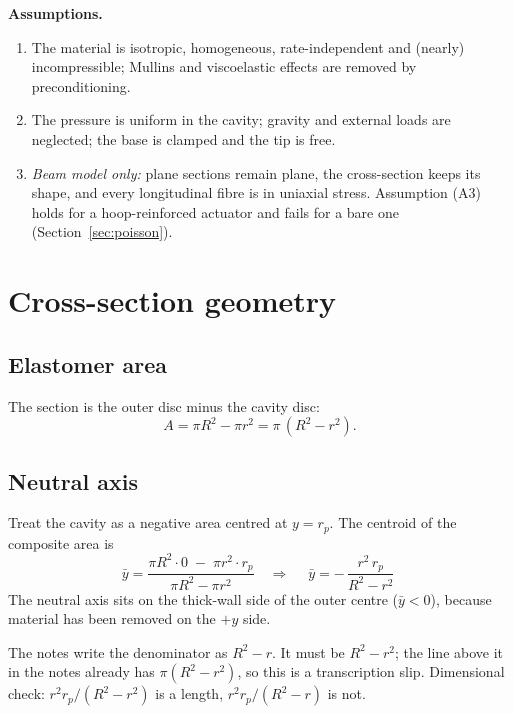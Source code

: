 \documentclass[11pt,a4paper]{article}
\numberwithin{equation}{section}
\newcommand{\rp}{r_p}
\begin{document}
\textbf{Assumptions.}
\begin{enumerate}[nosep,label=(A\arabic*)]
\item The material is isotropic, homogeneous, rate-independent and (nearly) incompressible; Mullins and
viscoelastic effects are removed by preconditioning.
\item The pressure is uniform in the cavity; gravity and external loads are neglected; the base is clamped and the tip is free.
\item \emph{Beam model only:} plane sections remain plane, the cross-section keeps its shape, and every longitudinal
fibre is in uniaxial stress. Assumption (A3) holds for a hoop-reinforced actuator and fails for a bare one (Section~\ref{sec:poisson}).
\end{enumerate}

\section{Cross-section geometry}\label{sec:section}

\subsection{Elastomer area}
The section is the outer disc minus the cavity disc:
\begin{equation}
A = \pi R^2 - \pi r^2 = \pi\,(R^2-r^2). \label{eq:A}
\end{equation}

\subsection{Neutral axis}
Treat the cavity as a negative area centred at $y=\rp$. The centroid of the composite area is
\begin{equation}
\bar y = \frac{\pi R^2\cdot 0 \;-\; \pi r^2\cdot \rp}{\pi R^2-\pi r^2}
\quad\Longrightarrow\quad
\boxed{\;\bar y = -\,\frac{r^2\,\rp}{R^2-r^2}\;} \label{eq:ybar}
\end{equation}
The neutral axis sits on the thick-wall side of the outer centre ($\bar y<0$), because material has been removed on the $+y$ side.

\begin{correction}[\ (notes eq.~2)]
The notes write the denominator as $R^2-r$. It must be $R^2-r^2$; the line above it in the notes already has
$\pi(R^2-r^2)$, so this is a transcription slip. Dimensional check: $r^2\rp/(R^2-r^2)$ is a length, $r^2\rp/(R^2-r)$ is not.
\end{correction}
\end{document}

